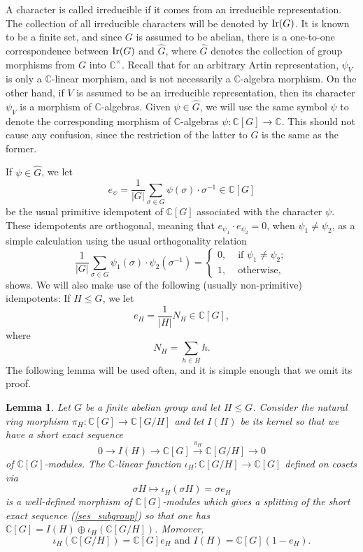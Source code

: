 \documentclass[11pt]{amsart}
\newtheorem{lemma}[theorem]{Lemma}
\numberwithin{equation}{section}
\theoremstyle{remark}
\theoremstyle{definition}
\begin{document}
A character is called irreducible if it comes from an irreducible representation.  The collection of all irreducible characters will be denoted by ${\rm Ir}(G)$.  It is known to be a finite set, and since $G$ is assumed to be abelian, there is a one-to-one correspondence between ${\rm Ir}(G)$ and $\widehat{G}$, where $\widehat{G}$ denotes the collection of group morphisms from $G$ into $\mathbb{C}^{\times}$.  Recall that for an arbitrary Artin representation, $\psi_{V}$ is only a $\mathbb{C}$-linear morphism, and is not necessarily a $\mathbb{C}$-algebra morphism.  On the other hand, if $V$ is assumed to be an irreducible representation, then its character $\psi_{V}$ is a morphism of $\mathbb{C}$-algebras.  Given $\psi \in \widehat{G}$, we will use the same symbol $\psi$ to denote the corresponding morphism of $\mathbb{C}$-algebras $\psi:\mathbb{C}[G] \rightarrow \mathbb{C}$.  This should not cause any confusion, since the restriction of the latter to $G$ is the same as the former.  

If $\psi \in \widehat{G}$, we let 
$$e_{\psi} = \frac{1}{|G|} \sum_{\sigma \in G}\psi(\sigma) \cdot \sigma^{-1} \in \mathbb{C}[G] $$
be the usual primitive idempotent of $\mathbb{C}[G]$ associated with the character $\psi$.  These idempotents are orthogonal, meaning that $e_{\psi_{1}} \cdot e_{\psi_{2}} = 0$, when $\psi_{1} \neq \psi_{2}$, as a simple calculation using the usual orthogonality relation
\begin{equation}\label{ortho}
\frac{1}{|G|} \sum_{\sigma \in G} \psi_{1}(\sigma) \cdot \psi_{2}(\sigma^{-1})=
\begin{cases}
0, &\text{ if } \psi_{1} \neq \psi_{2}; \\
1, &\text{ otherwise},
\end{cases}
\end{equation}
shows.  We will also make use of the following (usually non-primitive) idempotents:  If $H \le G$, we let
\begin{equation} \label{idem}
e_{H} = \frac{1}{|H|}N_{H} \in \mathbb{C}[G], 
\end{equation}
where
$$N_{H} = \sum_{h \in H} h. $$  
The following lemma will be used often, and it is simple enough that we omit its proof.
\begin{lemma} \label{useful_dec}
Let $G$ be a finite abelian group and let $H \le G$.  Consider the natural ring morphism $\pi_{H}:\mathbb{C}[G] \rightarrow \mathbb{C}[G/H]$ and let $I(H)$ be its kernel so that we have a short exact sequence
\begin{equation} \label{ses_subgroup}
0 \rightarrow I(H) \rightarrow \mathbb{C}[G] \stackrel{\pi_{H}}{\longrightarrow} \mathbb{C}[G/H] \rightarrow 0 
\end{equation}
of $\mathbb{C}[G]$-modules.  The $\mathbb{C}$-linear function $\iota_{H}:\mathbb{C}[G/H] \rightarrow \mathbb{C}[G]$ defined on cosets via
$$\sigma H \mapsto \iota_{H}(\sigma H) = \sigma e_{H} $$
is a well-defined morphism of $\mathbb{C}[G]$-modules which gives a splitting of the short exact sequence (\ref{ses_subgroup}) so that one has $\mathbb{C}[G] = I(H) \oplus \iota_{H}(\mathbb{C}[G/H])$.  Moreover,
$$\iota_{H}(\mathbb{C}[G/H]) = \mathbb{C}[G] e_{H} \text{ and } I(H) = \mathbb{C}[G](1-e_{H}). $$
\end{lemma}
\end{document}
